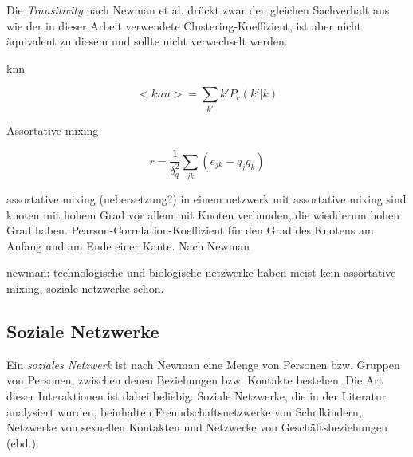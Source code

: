 Die \emph{Transitivity} nach Newman et al. dr\"uckt zwar den gleichen
Sachverhalt aus wie der in dieser Arbeit verwendete
Clustering-Koeffizient, ist aber nicht \"aquivalent zu diesem und
sollte nicht verwechselt werden.

knn

\begin{equation}
  \label{eq:9}
  <knn> = \sum_{k'} k'P_c (k'|k)
\end{equation}

Assortative mixing

\begin{equation}
  \label{eq:8}
  r = \frac{1}{\delta_{q}^{2}} \sum_{jk} \left(e_{jk} - q_jq_k\right)
\end{equation}

assortative mixing (uebersetzung?) in einem netzwerk mit assortative
mixing sind knoten mit hohem Grad vor allem mit Knoten verbunden, die
wiedderum hohen Grad haben. 
Pearson-Correlation-Koeffizient f\"ur den Grad des Knotens am Anfang
und am Ende einer Kante. Nach Newman

newman: technologische und biologische netzwerke haben meist kein
assortative mixing, soziale netzwerke schon.

\subsection{Soziale Netzwerke}
\label{sec:soziale-netzwerke}

Ein \emph{soziales Netzwerk} ist nach Newman\cite{newman:167} eine
Menge von Personen bzw. Gruppen von Personen, zwischen denen
Beziehungen bzw. Kontakte bestehen. Die Art dieser Interaktionen ist
dabei beliebig: Soziale Netzwerke, die in der Literatur analysiert
wurden, beinhalten Freundschaftsnetzwerke von Schulkindern, Netzwerke
von sexuellen Kontakten und Netzwerke von Gesch\"aftsbeziehungen
(ebd.).

